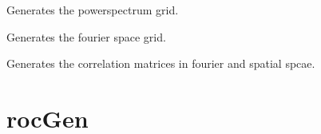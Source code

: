 \documentclass[letterpaper,10pt,english]{sphinxmanual}
\begin{document}
\begin{fulllineitems}
\begin{fulllineitems}
\label{\detokenize{gaussClass:gaussClass.GaussianRandomField.PowerSpectrum_grid_generator}}
\sphinxAtStartPar
Generates the powerspectrum grid.

\end{fulllineitems}


\begin{fulllineitems}
\label{\detokenize{gaussClass:gaussClass.GaussianRandomField.fourier_space_ind}}
\sphinxAtStartPar
Generates the fourier space grid.

\end{fulllineitems}


\begin{fulllineitems}
\label{\detokenize{gaussClass:gaussClass.GaussianRandomField.gen_correlation}}
\sphinxAtStartPar
Generates the correlation matrices in fourier and spatial spcae.

\end{fulllineitems}


\end{fulllineitems}



\chapter{rocGen}
\label{\detokenize{rocGen:rocgen}}\label{\detokenize{rocGen:id1}}\label{\detokenize{rocGen::doc}}\label{\detokenize{rocGen:module-rocGen}}
\end{document}
